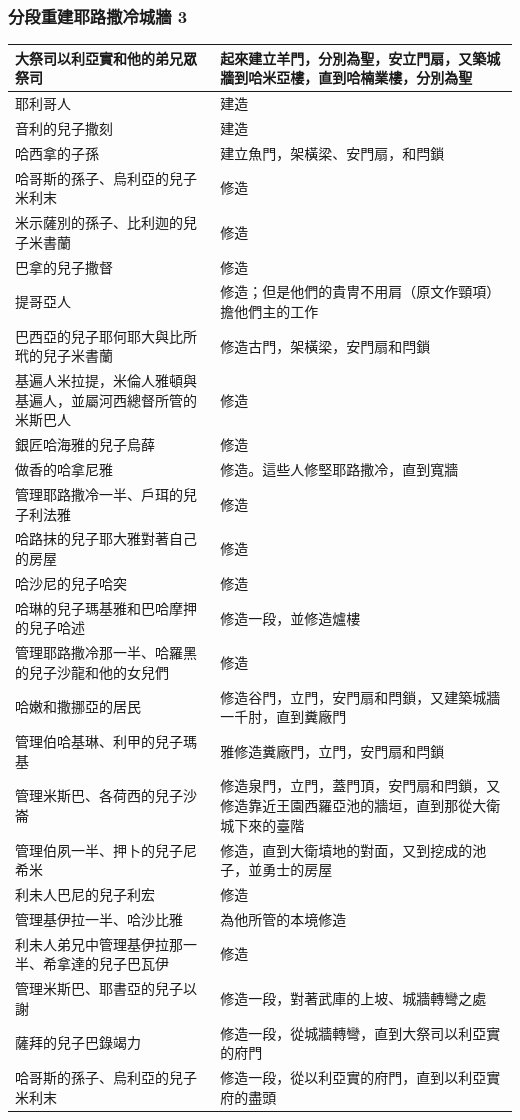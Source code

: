 \subsubsection{分段重建耶路撒冷城牆 3}
\begin{table}[H]
\centering 
\begin{tabular}{p{7cm}|p{8cm}}\hline\hline
大祭司以利亞實和他的弟兄眾祭司&起來建立羊門，分別為聖，安立門扇，又築城牆到哈米亞樓，直到哈楠業樓，分別為聖\\\hline
耶利哥人&建造 \\\hline
音利的兒子撒刻&建造\\\hline
哈西拿的子孫&建立魚門，架橫梁、安門扇，和閂鎖\\\hline
哈哥斯的孫子、烏利亞的兒子米利末&修造\\\hline
米示薩別的孫子、比利迦的兒子米書蘭&修造\\\hline
巴拿的兒子撒督&修造\\\hline
提哥亞人&修造；但是他們的貴冑不用肩（原文作頸項）擔他們主的工作\\\hline
巴西亞的兒子耶何耶大與比所玳的兒子米書蘭&修造古門，架橫梁，安門扇和閂鎖\\\hline
基遍人米拉提，米倫人雅頓與基遍人，並屬河西總督所管的米斯巴人&修造\\\hline
銀匠哈海雅的兒子烏薛&修造\\\hline
做香的哈拿尼雅&修造。這些人修堅耶路撒冷，直到寬牆\\\hline
管理耶路撒冷一半、戶珥的兒子利法雅&修造\\\hline
哈路抹的兒子耶大雅對著自己的房屋&修造\\\hline
哈沙尼的兒子哈突&修造\\\hline
哈琳的兒子瑪基雅和巴哈摩押的兒子哈述&修造一段，並修造爐樓\\\hline
管理耶路撒冷那一半、哈羅黑的兒子沙龍和他的女兒們&修造\\\hline
哈嫩和撒挪亞的居民&修造谷門，立門，安門扇和閂鎖，又建築城牆一千肘，直到糞廠門\\\hline
管理伯哈基琳、利甲的兒子瑪基&雅修造糞廠門，立門，安門扇和閂鎖\\\hline
管理米斯巴、各荷西的兒子沙崙&修造泉門，立門，蓋門頂，安門扇和閂鎖，又修造靠近王園西羅亞池的牆垣，直到那從大衛城下來的臺階\\\hline
管理伯夙一半、押卜的兒子尼希米&修造，直到大衛墳地的對面，又到挖成的池子，並勇士的房屋\\\hline
利未人巴尼的兒子利宏&修造\\\hline
管理基伊拉一半、哈沙比雅&為他所管的本境修造\\\hline
利未人弟兄中管理基伊拉那一半、希拿達的兒子巴瓦伊&修造\\\hline
管理米斯巴、耶書亞的兒子以謝&修造一段，對著武庫的上坡、城牆轉彎之處\\\hline
薩拜的兒子巴錄竭力&修造一段，從城牆轉彎，直到大祭司以利亞實的府門\\\hline
哈哥斯的孫子、烏利亞的兒子米利末&修造一段，從以利亞實的府門，直到以利亞實府的盡頭\\\hline
\end{tabular}
\end{table}


